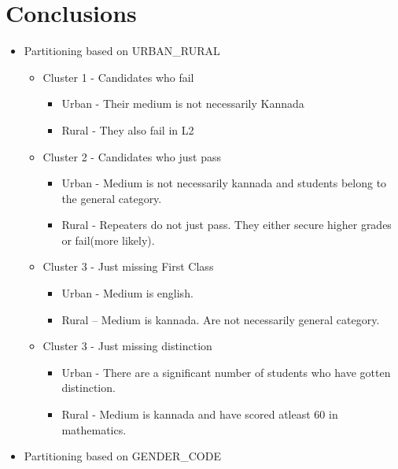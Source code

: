 \section*{Conclusions}
\begin{itemize}
\item Partitioning based on URBAN{\_}RURAL

\begin{itemize}

\item Cluster 1 - Candidates who fail
\begin{itemize}
\item Urban - Their medium is not necessarily Kannada
\item Rural - They also fail in L2
\end{itemize}

\item Cluster 2 - Candidates who just pass
\begin{itemize}
\item Urban - Medium is not necessarily kannada and students belong to the general category.
\item Rural - Repeaters do not just pass. They either secure higher grades or fail(more likely).
\end{itemize}


\item Cluster 3 - Just missing First Class
\begin{itemize}
\item Urban - Medium is english.
\item Rural – Medium is kannada. Are not necessarily general category.
\end{itemize}



\item Cluster 3 - Just missing distinction
\begin{itemize}
\item Urban - There are a significant number of students who have gotten distinction.
\item Rural - Medium is kannada and have scored atleast 60 in mathematics.
\end{itemize}

\end{itemize}








\item Partitioning based on GENDER{\_}CODE


\end{itemize}
